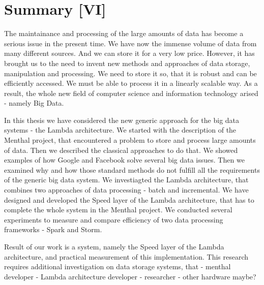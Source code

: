 \chapter{Summary [VI]}
\label{chap:summary}

The maintainance and processing of the large amounts of data has become a serious issue in the present time.
We have now the immense volume of data from many different sources.
And we can store it for a very low price.
However, it has brought us to the need to invent new methods and approaches of data storage, manipulation and processing.
We need to store it so, that it is robust and can be efficiently accessed.
We must be able to process it in a linearly scalable way.
As a result, the whole new field of computer science and information technology arised - namely Big Data.

In this thesis we have considered the new generic approach for the big data systems - the Lambda architecture.
We started with the description of the Menthal project, that encountered a problem to store and process large amounts of data.
Then we described the classical approaches to do that.
We showed examples of how Google and Facebook solve several big data issues.
Then we examined why and how those standard methods do not fulfill all the requirements of the generic big data system.
We investiagted the Lambda architecture, that combines two approaches of data processing - batch and incremental.
We have designed and developed the Speed layer of the Lambda architecture, that has to complete the whole system in the Menthal project.
We conducted several experiments to measure and compare efficiency of two data processing frameworks - Spark and Storm.

Result of our work is a system, namely the Speed layer of the Lambda architecture, and practical measurement of this implementation.
This research requires additional investigation on data storage systems, that
- menthal developer
- Lambda architecture developer
- researcher
- other hardware maybe?